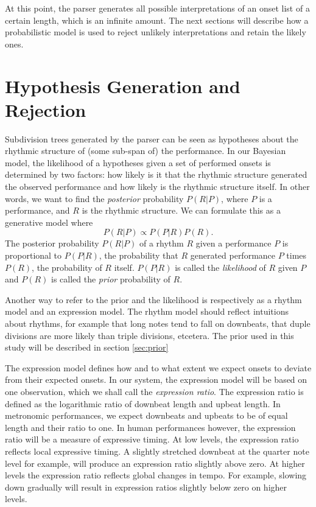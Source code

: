 At this point, the parser generates all possible interpretations of an onset list of a certain length, which is an infinite amount. The next sections will describe how a probabilistic model is used to reject unlikely interpretations and retain the likely ones.

\section{Hypothesis Generation and Rejection}
\label{sec:rejection}

Subdivision trees generated by the parser can be seen as hypotheses about the rhythmic structure of (some sub-span of) the performance. In our Bayesian model, the likelihood of a hypotheses given a set of performed onsets is determined by two factors: how likely is it that the rhythmic structure generated the observed performance and how likely is the rhythmic structure itself. In other words, we want to find the \textit{posterior} probability $P(R|P)$, where $P$ is a performance, and $R$ is the rhythmic structure. We can formulate this as a generative model where
\begin{equation}
\label{eq:model}
P(R|P) \propto P(P|R)P(R).
\end{equation}
The posterior probability $P(R|P)$ of a rhythm $R$ given a performance $P$ is proportional to $P(P|R)$, the probability that $R$ generated performance $P$ times $P(R)$, the probability of $R$ itself. $P(P|R)$ is called the \textit{likelihood} of $R$ given $P$ and $P(R)$ is called the \textit{prior} probability of $R$.

Another way to refer to the prior and the likelihood is respectively as a rhythm model and an expression model. The rhythm model should reflect intuitions about rhythms, for example that long notes tend to fall on downbeats, that duple divisions are more likely than triple divisions, etcetera. The prior used in this study will be described in section \ref{sec:prior}

The expression model defines how and to what extent we expect onsets to deviate from their expected onsets. In our system, the expression model will be based on one observation, which we shall call the \textit{expression ratio}. The expression ratio is defined as the logarithmic ratio of downbeat length and upbeat length. In metronomic performances, we expect downbeats and upbeats to be of equal length and their ratio to one. In human performances however, the expression ratio will be a measure of expressive timing. At low levels, the expression ratio reflects local expressive timing. A slightly stretched downbeat at the quarter note level for example, will produce an expression ratio slightly above zero. At higher levels the expression ratio reflects global changes in tempo. For example, slowing down gradually will result in expression ratios slightly below zero on higher levels.

